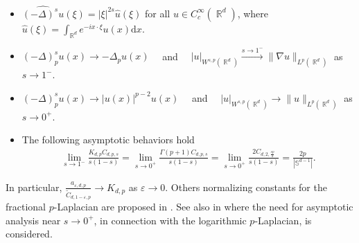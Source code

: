 \documentclass[12pt, reqno]{amsart}%
\theoremstyle{plain}  %
\theoremstyle{definition}  %
\numberwithin{equation}{section}
\DeclareMathOperator{\R}{\mathbb{R}}
\renewcommand{\d}{\mathrm{d}}
\newcommand{\eps}{\varepsilon}
\begin{document}
\begin{itemize}
\item $\widehat{(-\Delta)^s u}(\xi)= |\xi|^{2s}\widehat{u}(\xi)$  for all $u\in C_c^\infty(\R^d)$, where $ \widehat{u}(\xi) =\int_{\R^d} e^{-ix\cdot \xi} u(x)\d x$.
\item  $(-\Delta)^s_p u(x)\to -\Delta_p u(x)\quad$  and  $\quad|u|_{W^{s,p}(\R^d)}\xrightarrow{s\to1^-}\|\nabla u\|_{L^{p}(\R^d)}$ as  $s\to1^-$.
\item $(-\Delta)^s_p u(x)\to |u(x)|^{p-2} u(x)\quad$  and  $\quad|u|_{W^{s,p}(\R^d)}\to \|u\|_{L^{p}(\R^d)}$ as  $s\to0^+$.
\item The following asymptotic behaviors hold
\begin{align*}
\lim_{s\to1^-} \frac{K_{d,p}C_{d,p,s}}{s(1-s)}=\lim_{s\to 0^+}\frac{\Gamma(p+1)C_{d,p,s}}{s(1-s)}=\lim_{s\to 0^+} \frac{2C_{d,2, \frac{sp}{2}}}{s(1-s)}=\frac{2p}{|\mathbb{S}^{d-1}|}.
\end{align*}
\end{itemize}
In particular, $ \frac{a_{\eps,d,p} }{\widetilde{C}_{d,1-\eps,p}}\to K_{d,p}$  as $\eps\to 0$. Others normalizing constants for the fractional $p$-Laplacian are proposed in \cite{War16,dTGCV21}. See  also in \cite{DJS25} where the need for asymptotic  analysis near $s \to 0^+$, in connection with the logarithmic $p$-Laplacian, is considered.
\end{document}
